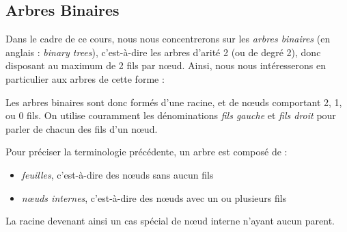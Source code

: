 \documentclass[11pt,a4paper]{article}
\begin{document}
\subsection{Arbres Binaires}

Dans le cadre de ce cours, nous nous concentrerons sur les \textit{arbres binaires} (en anglais : \textit{binary trees}), c'est-à-dire les arbres d'arité 2 (ou de degré 2), donc disposant au maximum de 2 fils par nœud.
%
Ainsi, nous nous intéresserons en particulier aux arbres de cette forme :

\begin{center}
\end{center}


Les arbres binaires sont donc formés d'une racine, et de nœuds comportant 2, 1, ou 0 fils.
On utilise couramment les dénominations \textit{fils gauche} et \textit{fils droit} pour parler de chacun des fils d'un nœud.

\medskip

Pour préciser la terminologie précédente, un arbre est composé de :
\begin{itemize}
\item \textit{feuilles}, c'est-à-dire des nœuds sans aucun fils
\item \textit{nœuds internes}, c'est-à-dire des nœuds avec un ou plusieurs fils
\end{itemize}

La racine devenant ainsi un cas spécial de nœud interne n'ayant aucun parent.


\clearpage
\end{document}
